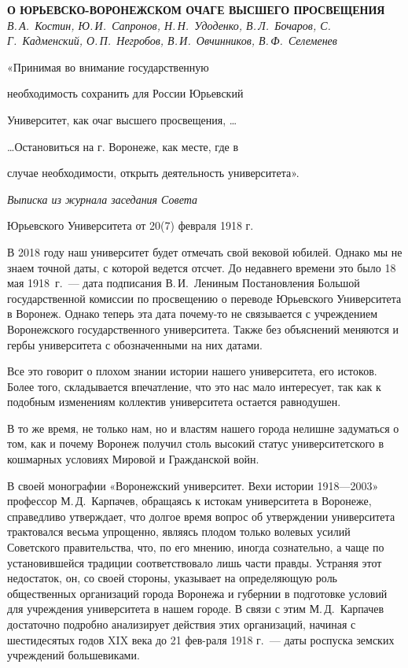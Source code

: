 \begin{center}{ \bf  О ЮРЬЕВСКО-ВОРОНЕЖСКОМ ОЧАГЕ ВЫСШЕГО ПРОСВЕЩЕНИЯ}\\
{\it В.\,А.~Костин, Ю.\,И.~Сапронов, Н.\,Н.~Удоденко, В.\,Л.~Бочаров, С.\,Г.~Кадменский, О.\,П.~Негробов, В.\,И.~Овчинников, В.\,Ф.~Селеменев
} \\
\end{center}

\begin{flushright}
«Принимая во внимание государственную

необходимость сохранить для России Юрьевский

Университет, как очаг высшего просвещения, …

…Остановиться на г. Воронеже, как месте, где в

случае необходимости, открыть деятельность университета».

{\it Выписка из журнала заседания Совета

Юрьевского Университета от 20(7) февраля 1918 г.}
\end{flushright}
В	2018 году наш университет будет отмечать свой вековой юбилей. Однако мы не знаем точной даты, с которой ведется отсчет. До недавнего времени это было 18 мая 1918~г.~--- дата подписания В.\,И.~Лениным Постановления Большой государственной комиссии по просвещению о переводе Юрьевского Университета в	Воронеж. Однако теперь эта дата \linebreak почему-то не связывается с учреждением Воронежского государственного университета. Также без объяснений меняются и гербы университета с обозначенными на них датами.

Все это говорит о плохом знании истории нашего университета, его истоков. Более того, складывается впечатление, что это нас мало интересует, так как к подобным изменениям коллектив университета остается равнодушен.

В	то же время, не только нам, но и властям нашего города нелишне задуматься о том, как и почему Воронеж получил столь высокий статус университетского в кошмарных условиях Мировой и Гражданской войн.

В	своей монографии «Воронежский университет. Вехи истории 1918—2003» профессор М.\,Д.~Карпачев, обращаясь к истокам университета в Воронеже, справедливо утверждает, что долгое время вопрос об утверждении университета трактовался весьма упрощенно, являясь плодом только волевых усилий Советского правительства, что, по его мнению, иногда сознательно, а чаще по установившейся традиции соответствовало лишь части правды. Устраняя этот недостаток, он, со своей стороны, указывает на определяющую роль общественных организаций города Воронежа и губернии в подготовке условий для учреждения университета в нашем городе. В связи с	этим М.\,Д.~Карпачев достаточно подробно анализирует действия этих организаций, начиная с шестидесятых годов XIX века до 21 фев-раля 1918 г.~--- даты роспуска земских учреждений большевиками.

